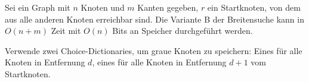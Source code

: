 \documentclass{cheat-sheet}
\begin{document}
\begin{thm}
  Sei ein Graph mit $n$ Knoten und $m$ Kanten gegeben, $r$ ein Startknoten, von dem aus alle anderen Knoten erreichbar sind.
  Die Variante B der Breitensuche kann in $O(n + m)$ Zeit mit $O(n)$ Bits an Speicher durchgeführt werden.
\end{thm}

\begin{idee}
  Verwende zwei Choice-Dictionaries, um graue Knoten zu speichern: Eines für alle Knoten in Entfernung $d$, eines für alle Knoten in Entfernung $d + 1$ vom Startknoten.
\end{idee}
\end{document}
